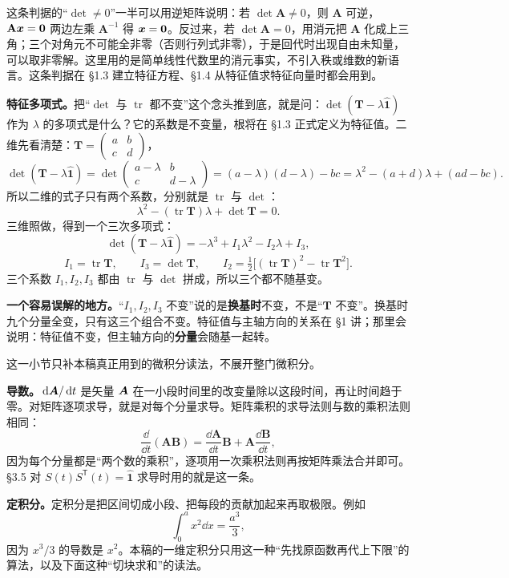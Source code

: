 \documentclass[11pt]{ctexart}
\newcommand{\ten}[1]{\mathbf{#1}}
\newcommand{\unitd}{\hat{\ten{1}}}
\newcommand{\tr}{\operatorname{tr}}
\let\origsubhdr\subhdr
\renewcommand{\subhdr}[1]{\par\needspace{3\baselineskip}\origsubhdr{#1}}
\begin{document}
这条判据的“$\det\ne0$”一半可以用逆矩阵说明：若 $\det\ten A\ne0$，则 $\ten A$ 可逆，$\ten A\vect x=\vect0$ 两边左乘 $\ten A^{-1}$ 得 $\boldsymbol{x}=\boldsymbol{0}$。反过来，若 $\det\ten A=0$，用消元把 $\ten A$ 化成上三角；三个对角元不可能全非零（否则行列式非零），于是回代时出现自由未知量，可以取非零解。这里用的是简单线性代数里的消元事实，不引入秩或维数的新语言。这条判据在 \S1.3 建立特征方程、\S1.4 从特征值求特征向量时都会用到。

\textbf{特征多项式。}把“$\det$ 与 $\tr$ 都不变”这个念头推到底，就是问：$\det(\ten T-\lambda\unitd)$ 作为 $\lambda$ 的多项式是什么？它的系数是不变量，根将在 \S1.3 正式定义为特征值。二维先看清楚：$\ten T=\begin{pmatrix}a&b\\c&d\end{pmatrix}$，
\[
\det(\ten T-\lambda\unitd)=\det\begin{pmatrix}a-\lambda&b\\c&d-\lambda\end{pmatrix}
=(a-\lambda)(d-\lambda)-bc=\lambda^2-(a+d)\lambda+(ad-bc).
\]
所以二维的式子只有两个系数，分别就是 $\tr$ 与 $\det$：
\[
\lambda^2-(\tr\ten T)\lambda+\det\ten T=0 .
\]
三维照做，得到一个三次多项式：
\[
\det(\ten T-\lambda\unitd)=-\lambda^3+I_1\lambda^2-I_2\lambda+I_3 ,
\]
\[
I_1=\tr\ten T,\qquad
I_3=\det\ten T,\qquad
I_2=\tfrac12\bigl[(\tr\ten T)^2-\tr\ten T^2\bigr].
\]
三个系数 $I_1,I_2,I_3$ 都由 $\tr$ 与 $\det$ 拼成，所以三个都不随基变。

\textbf{一个容易误解的地方。}“$I_1,I_2,I_3$ 不变”说的是\textbf{换基时}不变，不是“$\ten T$ 不变”。换基时九个分量全变，只有这三个组合不变。特征值与主轴方向的关系在 \S1 讲；那里会说明：特征值不变，但主轴方向的\textbf{分量}会随基一起转。

\label{subsec:calculus}

这一小节只补本稿真正用到的微积分读法，不展开整门微积分。

\textbf{导数。}$\,\mathrm{d}\boldsymbol{A}/\,\mathrm{d} t$ 是矢量 $\boldsymbol{A}$ 在一小段时间里的改变量除以这段时间，再让时间趋于零。对矩阵逐项求导，就是对每个分量求导。矩阵乘积的求导法则与数的乘积法则相同：
\[
\frac{\dd}{\dd t}(\ten A\ten B)=\frac{\dd\ten A}{\dd t}\ten B+\ten A\frac{\dd\ten B}{\dd t},
\]
因为每个分量都是“两个数的乘积”，逐项用一次乘积法则再按矩阵乘法合并即可。\S3.5 对 $S(t)S^{\mathsf T}(t)=\unitd$ 求导时用的就是这一条。

\textbf{定积分。}定积分是把区间切成小段、把每段的贡献加起来再取极限。例如
\[
\int_0^a x^2\dd x=\frac{a^3}{3},
\]
因为 $x^3/3$ 的导数是 $x^2$。本稿的一维定积分只用这一种“先找原函数再代上下限”的算法，以及下面这种“切块求和”的读法。
\end{document}
